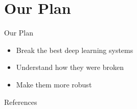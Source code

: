 \documentclass{beamer}
\begin{document}
\section{Our Plan}

\begin{frame}{Our Plan}
\begin{itemize}
    \item Break the best deep learning systems
    \pause
    \item Understand how they were broken
    \pause
    \item Make them more robust
\end{itemize}
\end{frame}



\begin{frame}[allowframebreaks]{References}
    \printbibliography
\end{frame}
\end{document}
